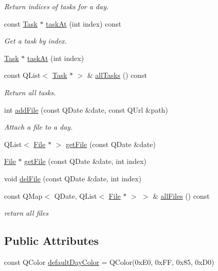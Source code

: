 \begin{DoxyCompactItemize}
\begin{DoxyCompactList}\small\item\em Return indices of tasks for a day. \end{DoxyCompactList}\item 
const \hyperlink{classTask}{Task} $\ast$ \hyperlink{classData_ad46736016dc5ea00f2a98592e44e58f0}{task\+At} (int index) const 
\begin{DoxyCompactList}\small\item\em Get a task by index. \end{DoxyCompactList}\item 
\hyperlink{classTask}{Task} $\ast$ \hyperlink{classData_a4009575e5594138ae5b2d736480f46d2}{task\+At} (int index)
\item 
const Q\+List$<$ \hyperlink{classTask}{Task} $\ast$ $>$ \& \hyperlink{classData_a4e41f32520d3fc33a76d2e1eeda77883}{all\+Tasks} () const 
\begin{DoxyCompactList}\small\item\em Return all tasks. \end{DoxyCompactList}\item 
int \hyperlink{classData_aa571f90439e6d2890a94f86fc2324821}{add\+File} (const Q\+Date \&date, const Q\+Url \&path)
\begin{DoxyCompactList}\small\item\em Attach a file to a day. \end{DoxyCompactList}\item 
Q\+List$<$ \hyperlink{classFile}{File} $\ast$ $>$ \hyperlink{classData_af806515016b248a38ad33582509ffef5}{get\+File} (const Q\+Date \&date)
\item 
\hyperlink{classFile}{File} $\ast$ \hyperlink{classData_af5184411eed2650b9af48e21915c307f}{get\+File} (const Q\+Date \&date, int index)
\item 
void \hyperlink{classData_af027d735856b6505cf94ac3420700390}{del\+File} (const Q\+Date \&date, int index)
\item 
const Q\+Map$<$ Q\+Date, Q\+List$<$ \hyperlink{classFile}{File} $\ast$ $>$ $>$ \& \hyperlink{classData_a2a4f70a2e889f7f2a80a252571438030}{all\+Files} () const 
\begin{DoxyCompactList}\small\item\em return all files \end{DoxyCompactList}\end{DoxyCompactItemize}
\subsection*{Public Attributes}
\begin{DoxyCompactItemize}
\item 
const Q\+Color \hyperlink{classData_a5baa18f96bc11fe93566709af7fe16ba}{default\+Day\+Color} = Q\+Color(0x\+E0, 0x\+F\+F, 0x85, 0x\+D0)
\end{DoxyCompactItemize}
